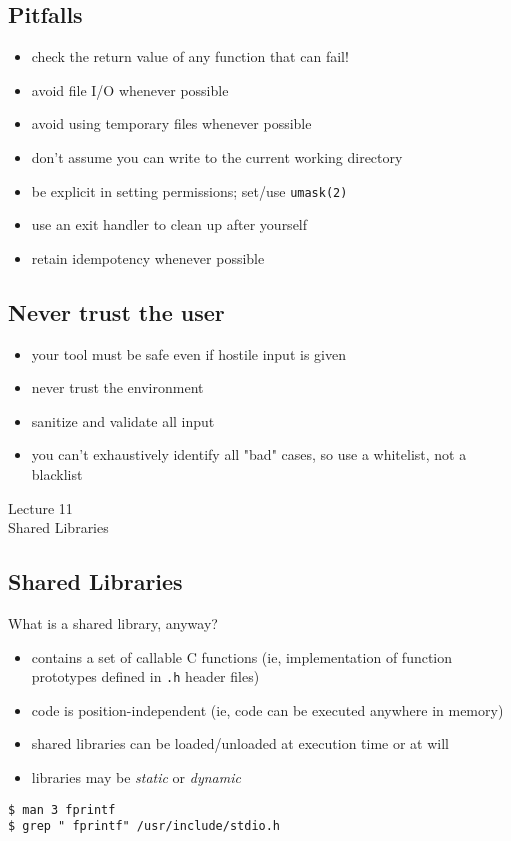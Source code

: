 \documentclass[xga]{xdvislides}
\begin{document}
\subsection{Pitfalls}
\begin{itemize}
	\item check the return value of any function that can fail!
	\item avoid file I/O whenever possible
	\item avoid using temporary files whenever possible
	\item don't assume you can write to the current working directory
	\item be explicit in setting permissions; set/use \verb+umask(2)+
	\item use an exit handler to clean up after yourself
	\item retain idempotency whenever possible
\end{itemize}

\subsection{Never trust the user}
\begin{itemize}
	\item your tool must be safe even if hostile input is given
	\item never trust the environment
	\item sanitize and validate all input
	\item you can't exhaustively identify all "bad" cases, so use a whitelist, not a blacklist
\end{itemize}

\newpage
\vspace*{\fill}
\begin{center}
  \Hugesize
	Lecture 11
	\hspace*{5mm}\blueline\\ [1em]
	Shared Libraries
  \Normalsize
\end{center}
\vspace*{\fill}



\subsection{Shared Libraries}
What is a shared library, anyway?
\begin{itemize}
	\item contains a set of callable C functions (ie, implementation
		of function prototypes defined in {\tt .h} header files)
	\item code is position-independent (ie, code can be executed anywhere
		in memory)
	\item shared libraries can be loaded/unloaded at execution time or at will
	\item libraries may be {\em static} or {\em dynamic}
\end{itemize}
\begin{verbatim}
$ man 3 fprintf
$ grep " fprintf" /usr/include/stdio.h
\end{verbatim}
\end{document}
